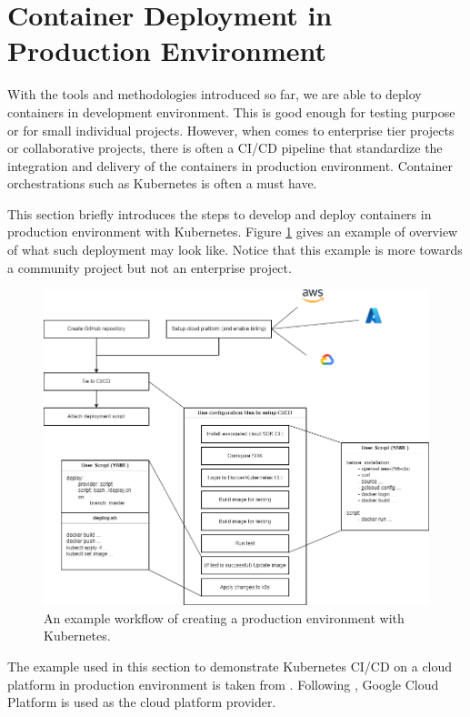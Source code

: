 \section{Container Deployment in Production Environment}

With the tools and methodologies introduced so far, we are able to deploy containers in development environment. This is good enough for testing purpose or for small individual projects. However, when comes to enterprise tier projects or collaborative projects, there is often a CI/CD pipeline that standardize the integration and delivery of the containers in production environment. Container orchestrations such as Kubernetes is often a must have.

This section briefly introduces the steps to develop and deploy containers in production environment with Kubernetes. Figure \ref{ch:vac:fig:prodenvworkflow} gives an example of overview of what such deployment may look like. Notice that this example is more towards a community project but not an enterprise project.

\begin{figure}
	\centering
	\includegraphics[width=350pt]{chapters/ch-virtualization-and-containerization/figures/prodenvworkflow.png}
	\caption{An example workflow of creating a production environment with Kubernetes.} \label{ch:vac:fig:prodenvworkflow}
\end{figure}

The example used in this section to demonstrate Kubernetes CI/CD on a cloud platform in production environment is taken from \cite{stephen2023docker}. Following \cite{stephen2023docker}, Google Cloud Platform is used as the cloud platform provider.

